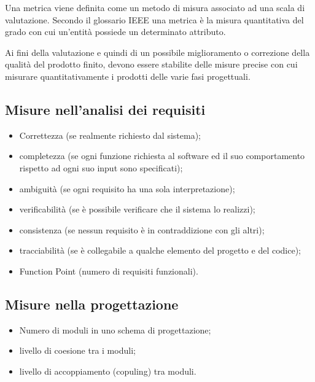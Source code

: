 Una metrica viene definita come un metodo di misura associato ad una scala di
valutazione. Secondo il glossario IEEE una metrica \`e la misura quantitativa del
grado con cui un'entit\`a possiede un determinato attributo.

Ai fini della valutazione e quindi di un possibile miglioramento o
correzione della qualit\`a del prodotto finito, devono essere stabilite delle
misure precise con cui misurare quantitativamente i prodotti delle varie fasi
progettuali.


\subsection{Misure nell'analisi dei requisiti}

\begin{itemize}
  
\item Correttezza (se realmente richiesto dal sistema);
\item completezza (se ogni funzione richiesta al software ed il suo
comportamento rispetto ad ogni suo input sono specificati);
\item ambiguit\`a (se ogni requisito ha una sola interpretazione);
\item verificabilit\`a (se \`e possibile verificare che il sistema lo realizzi);
\item consistenza (se nessun requisito \`e in contraddizione con gli altri);
\item tracciabilit\`a (se \`e collegabile a qualche elemento del progetto e del
codice);
\item Function Point (numero di requisiti funzionali).

\end{itemize}


\subsection{Misure nella progettazione}

\begin{itemize}
  
\item Numero di moduli in uno schema di progettazione;
\item livello di coesione tra i moduli;
\item livello di accoppiamento (copuling) tra moduli.

\end{itemize}


